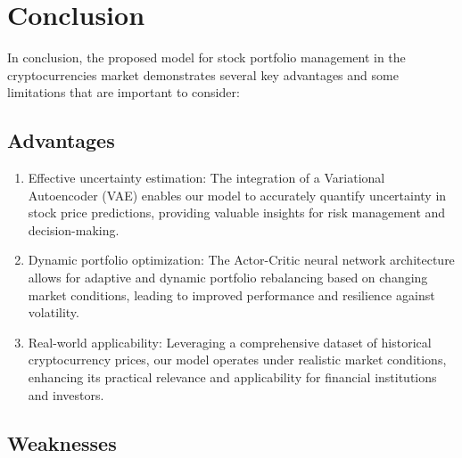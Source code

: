 \section{Conclusion}


In conclusion, the proposed model for stock portfolio management in the cryptocurrencies market demonstrates several key advantages and some limitations that are important to consider:

\subsection{Advantages}

\begin{enumerate}
	\item Effective uncertainty estimation: The integration of a Variational Autoencoder (VAE) enables our model to accurately quantify uncertainty in stock price predictions, providing valuable insights for risk management and decision-making.
	
	\item Dynamic portfolio optimization: The Actor-Critic neural network architecture allows for adaptive and dynamic portfolio rebalancing based on changing market conditions, leading to improved performance and resilience against volatility.
	
	
	\item Real-world applicability: Leveraging a comprehensive dataset of historical cryptocurrency prices, our model operates under realistic market conditions, enhancing its practical relevance and applicability for financial institutions and investors.
	
\end{enumerate}


\subsection{Weaknesses}


